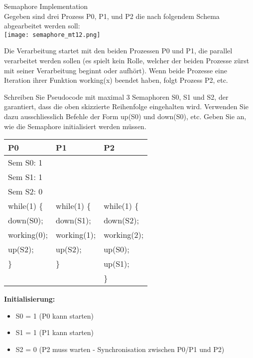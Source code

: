 \begin{example2}{Semaphore Implementation}\\
    Gegeben sind drei Prozess P0, P1, und P2 die nach folgendem Schema abgearbeitet werden soll:\\
    \texttt{[image: semaphore\_mt12.png]}
    
    Die Verarbeitung startet mit den beiden Prozessen P0 und P1, die parallel verarbeitet werden sollen (es spielt kein Rolle, welcher der beiden Prozesse zürst mit seiner Verarbeitung beginnt oder aufhört). Wenn beide Prozesse eine Iteration ihrer Funktion working(x) beendet haben, folgt Prozess P2, etc.
    
    Schreiben Sie Pseudocode mit maximal 3 Semaphoren S0, S1 und S2, der garantiert, dass die oben skizzierte Reihenfolge eingehalten wird. Verwenden Sie dazu ausschliesslich Befehle der Form up(S0) und down(S0), etc. Geben Sie an, wie die Semaphore initialisiert werden müssen.
    
    \tcblower

    \begin{minipage}{0.56\linewidth}
    
    \begin{center}
    \begin{tabular}{|l|l|l|}
    \hline
    \textbf{P0} & \textbf{P1} & \textbf{P2} \\
    \hline
    Sem S0: 1 &  & \\
    Sem S1: 1 &  & \\
    Sem S2: 0 &  & \\
    \hline
    while(1) \{ & while(1) \{ & while(1) \{ \\
    \quad \quad down(S0); & \quad \quad down(S1); & \quad \quad down(S2); \\
    \quad \quad working(0); & \quad \quad working(1); & \quad \quad working(2); \\
    \quad \quad up(S2); & \quad \quad up(S2); & \quad \quad up(S0); \\
    \} & \} & \quad \quad up(S1); \\
     &  & \} \\
    \hline
    \end{tabular}
    \end{center}
    \end{minipage}
    \begin{minipage}{0.42\linewidth}
    
    \textbf{Initialisierung:}
    \begin{itemize}
        \item S0 = 1 (P0 kann starten)
        \item S1 = 1 (P1 kann starten) 
        \item S2 = 0 (P2 muss warten - Synchronisation zwischen P0/P1 und P2)
    \end{itemize}
    

\end{minipage}
\end{example2}
